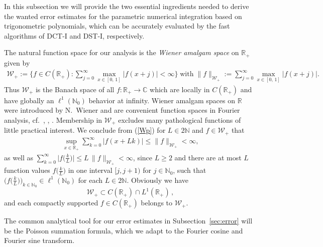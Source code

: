 \documentclass[11pt,a4paper]{scrartcl}
\numberwithin{equation}{section}
\numberwithin{table}{section}
\numberwithin{figure}{section}
\newcommand{\R}{\mathbb R}
\newcommand{\C}{\mathbb C}
\newcommand{\N}{\mathbb N}
\newcommand{\Rp}{{\mathbb R}_{+}}
\newcommand{\Np}{{\mathbb N}_0}
\newcommand{\Wp}{{\mathcal W}_{+}}
\begin{document}
In this subsection we will provide the two essential ingredients needed to derive the wanted error estimates
for the parametric numerical integration based on trigonometric polynomials, which can be accurately evaluated by the fast algorithms of DCT-I  and DST-I, respectively.

The natural function space for our analysis is the \emph{Wiener amalgam space} on ${\mathbb R}_+$ given by
\begin{align}\label{Wp}
\Wp :=   \textstyle \big\{ f \in C(\Rp):  \sum\limits_{j = 0}^{\infty} \max\limits_{x \in [0,\,1]} |f(x + j)| < \infty \big\}
\; \text{with} \;
\|f\|_{\Wp} := \sum\limits_{j = 0}^{\infty} \max\limits_{x \in [0,\,1]} |f(x + j)|.
\end{align}
Thus $\Wp$ is the Banach space of all $f:\Rp \to \C$ which are locally in $C(\Rp)$ and have
globally an $\ell^1(\Np)$ behavior at infinity. Wiener amalgam spaces on $\R$ were introduced by
N.~Wiener \cite[p.~73]{Wiener} and are convenient function spaces in Fourier analysis, cf.\
\cite{Fe92a}, \cite[pp.~103--105]{G01}, \cite{EhGrKl24}. Membership in $\Wp$ excludes many
pathological functions of little practical interest.
We conclude from (\ref{Wp}) for  $L \in 2 \N$   and $f \in \Wp$ that
\begin{align}\label{l1}
	 \textstyle \sup\limits_{x \in \Rp} \sum\limits_{k = 0}^{\infty} |f(x + Lk)|
	\leq \|f\|_{\Wp} < \infty,
\end{align}
as well as
$\sum\limits_{k = 0}^{\infty} \big|f\big(\tfrac{k}{L}\big)\big|
	\leq L\,\|f\|_{\Wp} < \infty$,
since $L\ge 2$ and there are at most $L$ function values $f\big(\tfrac{k}{L}\big)$ in one interval $[j, j+1)$ for $j \in \Np$,
such that $\big(f\big(\tfrac{k}{L}\big)\bigr)_{k \in \Np} \in \ell^1(\Np)$ for
each $L \in 2 \N$. Obviously we have
$$
\Wp \subset C(\Rp) \cap L^1(\Rp)\,,
$$
and each compactly supported $f \in C(\Rp)$ belongs to $\Wp$.

The common analytical tool for our error estimates in
Subsection~\ref{sec:error} will be the Poisson summation
formula, which we adapt to the Fourier cosine and Fourier sine transform.
\end{document}
